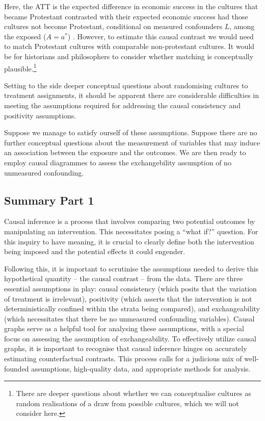 \documentclass[
  singlecolumn]{report}
\begin{document}
Here, the ATT is the expected difference in economic success in the
cultures that became Protestant contrasted with their expected economic
success had those cultures not become Protestant, conditional on
measured confounders \(L\), among the exposed (\(A = a^*\)) . However,
to estimate this causal contrast we would need to match Protestant
cultures with comparable non-protestant cultures. It would be for
historians and philosophers to consider whether matching is conceptually
plausible.\footnote{There are deeper questions about whether we can
  conceptualise cultures as random realisations of a draw from possible
  cultures, which we will not consider here.}

Setting to the side deeper conceptual questions about randomising
cultures to treatment assignments, it should be apparent there are
considerable difficulties in meeting the assumptions required for
addressing the causal consistency and positivity assumptions.

Suppose we manage to satisfy ourself of these assumptions. Suppose there
are no further conceptual questions about the measurement of variables
that may induce an association between the exposure and the outcomes. We
are then ready to employ causal diagrammes to assess the exchangebility
assumption of no unmeasured confounding.

\hypertarget{summary-part-1}{%
\subsection{Summary Part 1}\label{summary-part-1}}

Causal inference is a process that involves comparing two potential
outcomes by manipulating an intervention. This necessitates posing a
``what if?'' question. For this inquiry to have meaning, it is crucial
to clearly define both the intervention being imposed and the potential
effects it could engender.

Following this, it is important to scrutinise the assumptions needed to
derive this hypothetical quantity -- the causal contrast -- from the
data. There are three essential assumptions in play: causal consistency
(which posits that the variation of treatment is irrelevant), positivity
(which asserts that the intervention is not deterministically confined
within the strata being compared), and exchangeability (which
necessitates that there be no unmeasured confounding variables). Causal
graphs serve as a helpful tool for analysing these assumptions, with a
special focus on assessing the assumption of exchangeability. To
effectively utilize causal graphs, it is important to recognise that
causal inference hinges on accurately estimating counterfactual
contrasts. This process calls for a judicious mix of well-founded
assumptions, high-quality data, and appropriate methods for analysis.
\end{document}
